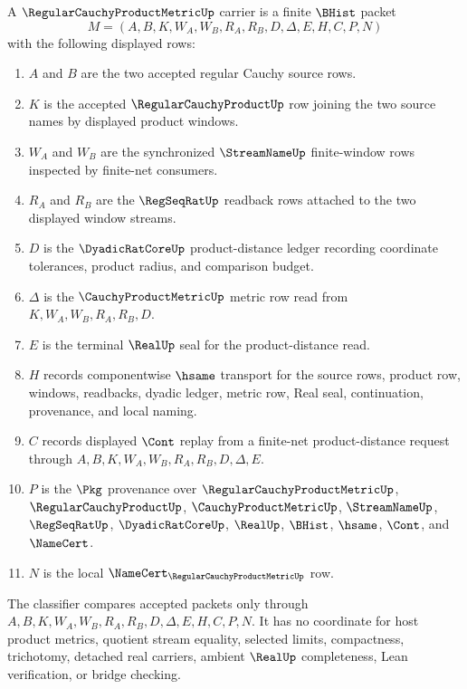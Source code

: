 \begin{definition}
\label{def:regular-cauchy-product-metric-carrier}
A $\RegularCauchyProductMetricUp$ carrier is a finite $\BHist$ packet
$$
M=(A,B,K,W_A,W_B,R_A,R_B,D,\Delta,E,H,C,P,N)
$$
with the following displayed rows:
\begin{enumerate}
\item $A$ and $B$ are the two accepted regular Cauchy source rows.
\item $K$ is the accepted $\RegularCauchyProductUp$ row joining the two source names by displayed product windows.
\item $W_A$ and $W_B$ are the synchronized $\StreamNameUp$ finite-window rows inspected by finite-net consumers.
\item $R_A$ and $R_B$ are the $\RegSeqRatUp$ readback rows attached to the two displayed window streams.
\item $D$ is the $\DyadicRatCoreUp$ product-distance ledger recording coordinate tolerances, product radius, and comparison budget.
\item $\Delta$ is the $\CauchyProductMetricUp$ metric row read from $K,W_A,W_B,R_A,R_B,D$.
\item $E$ is the terminal $\RealUp$ seal for the product-distance read.
\item $H$ records componentwise $\hsame$ transport for the source rows, product row, windows, readbacks, dyadic ledger, metric row, Real seal, continuation, provenance, and local naming.
\item $C$ records displayed $\Cont$ replay from a finite-net product-distance request through $A,B,K,W_A,W_B,R_A,R_B,D,\Delta,E$.
\item $P$ is the $\Pkg$ provenance over $\RegularCauchyProductMetricUp$, $\RegularCauchyProductUp$, $\CauchyProductMetricUp$, $\StreamNameUp$, $\RegSeqRatUp$, $\DyadicRatCoreUp$, $\RealUp$, $\BHist$, $\hsame$, $\Cont$, and $\NameCert$.
\item $N$ is the local $\NameCert_{\RegularCauchyProductMetricUp}$ row.
\end{enumerate}
The classifier compares accepted packets only through $A,B,K,W_A,W_B,R_A,R_B,D,\Delta,E,H,C,P,N$. It has no coordinate for host product metrics, quotient stream equality, selected limits, compactness, trichotomy, detached real carriers, ambient $\RealUp$ completeness, Lean verification, or bridge checking.
\end{definition}

